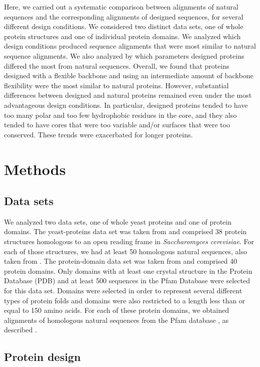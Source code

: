 \documentclass[12pt]{article}
\begin{document}
Here, we carried out a systematic comparison between alignments of natural sequences and the corresponding alignments of designed sequences, for several different design conditions. We considered two distinct data sets, one of whole protein structures and one of individual protein domains. We analyzed which design conditions produced sequence alignments that were most similar to natural sequence alignments. We also analyzed by which parameters designed proteins differed the most from natural sequences. Overall, we found that proteins designed with a flexible backbone and using an intermediate amount of backbone flexibility were the most similar to natural proteins. However, substantial differences between designed and natural proteins remained even under the most advantageous design conditions. In particular, designed proteins tended to have too many polar and too few hydrophobic residues in the core, and they also tended to have cores that were too variable and/or surfaces that were too conserved. These trends were exacerbated for longer proteins.

\section{Methods}
\label{Methods}

\subsection{Data sets}

We analyzed two data sets, one of whole yeast proteins and one of protein domains. The yeast-proteins data set was taken from \citet{Ramsey2011} and comprised 38 protein structures homologous to an open reading frame in \emph{Saccharomyces cerevisiae}. For each of those structures, we had at least 50 homologous natural sequences, also taken from  \citet{Ramsey2011}. The protein-domain data set was taken from \citet{OllikainenKortemme} and comprised 40 protein domains. Only domains with at least one crystal structure in the Protein Database (PDB) and at least 500 sequences in the Pfam Database were selected for this data set. Domains were selected in order to represent several different types of protein folds and domains were also restricted to a length less than or equal to 150 amino acids. For each of these protein domains, we obtained alignments of homologous natural sequences from the Pfam database \citep{Pfam}, as described \citep{OllikainenKortemme}.

\subsection{Protein design}
\end{document}

